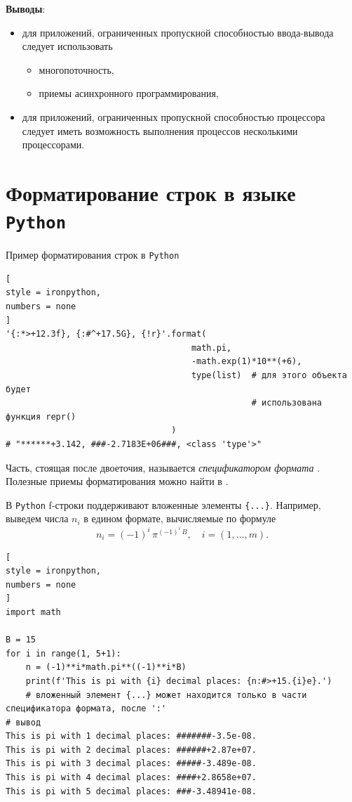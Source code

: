 \documentclass[%
	11pt,
	a4paper,
	utf8,
		]{article}
\begin{document}
\textbf{Выводы}:
\begin{itemize}
	\item для приложений, ограниченных пропускной способностью ввода-вывода следует использовать
	\begin{itemize}
		\item многопоточность,
		
		\item приемы асинхронного программирования,
	\end{itemize}

    \item для приложений, ограниченных пропускной способностью процессора следует иметь возможность выполнения процессов несколькими процессорами.
\end{itemize}


\section{Форматирование строк в языке \texttt{Python}}

Пример форматирования строк в \texttt{Python} 

\begin{lstlisting}[
style = ironpython,
numbers = none
]
'{:*>+12.3f}, {:#^+17.5G}, {!r}'.format(
                                     math.pi,
                                     -math.exp(1)*10**(+6),
                                     type(list)  # для этого объекта будет
                                                 # использована функция repr()
                                 )
# "******+3.142, ###-2.7183E+06###, <class 'type'>"
\end{lstlisting}

Часть, стоящая после двоеточия, называется \emph{спецификатором формата} \cite[]{ramalho:python-2016}. Полезные приемы форматирования можно найти в \cite{prohorenok:python-2016}.

В \texttt{Python} f-строки поддерживают вложенные элементы \verb|{...}|. Например, выведем числа $ n_i $ в едином формате, вычисляемые по формуле
$$
    n_i = (-1)^{i} \, \pi^{(-1)^i\,B}, \quad i = (1, \dots, m).
$$
\begin{lstlisting}[
style = ironpython,
numbers = none
]
import math

B = 15
for i in range(1, 5+1):
    n = (-1)**i*math.pi**((-1)**i*B)
    print(f'This is pi with {i} decimal places: {n:#>+15.{i}e}.')
    # вложенный элемент {...} может находится только в части спецификатора формата, после ':'
# вывод
This is pi with 1 decimal places: #######-3.5e-08.
This is pi with 2 decimal places: ######+2.87e+07.
This is pi with 3 decimal places: #####-3.489e-08.
This is pi with 4 decimal places: ####+2.8658e+07.
This is pi with 5 decimal places: ###-3.48941e-08.
\end{lstlisting}
\end{document}

